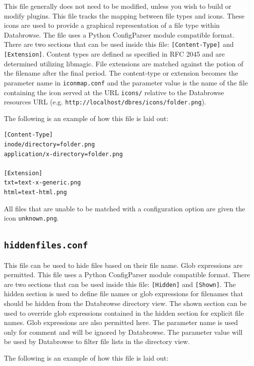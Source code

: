 \documentclass[10pt]{article}
\begin{document}
This file generally does not need to be modified, unless you wish to build or modify plugins.  This file tracks the mapping between file types and icons.  These icons are used to provide a graphical representation of a file type within Databrowse.  The file uses a Python ConfigParser module compatible format.  There are two sections that can be used inside this file:  \texttt{[Content-Type]} and \texttt{[Extension]}.  Content types are defined as specified in RFC 2045 and are determined utilizing libmagic.  File extensions are matched against the potion of the filename after the final period.  The content-type or extension becomes the parameter name in \texttt{iconmap.conf} and the parameter value is the name of the file containing the icon served at the URL \texttt{icons/} relative to the Databrowse resources URL (e.g. \texttt{http://localhost/dbres/icons/folder.png}).

The following is an example of how this file is laid out:

\begin{verbatim}
[Content-Type]
inode/directory=folder.png
application/x-directory=folder.png

[Extension]
txt=text-x-generic.png
html=text-html.png
\end{verbatim}

All files that are unable to be matched with a configuration option are given the icon \texttt{unknown.png}.

\subsection{\texttt{hiddenfiles.conf}}\label{hiddenfiles}

This file can be used to hide files based on their file name.  Glob expressions are permitted.  This file uses a Python ConfigParser module compatible format.  There are two sections that can be used inside this file:  \texttt{[Hidden]} and \texttt{[Shown]}.  The hidden section is used to define file names or glob expressions for filenames that should be hidden from the Databrowse directory view.  The shown section can be used to override glob expressions contained in the hidden section for explicit file names.  Glob expressions are also permitted here.  The parameter name is used only for comment and will be ignored by Databrowse.  The parameter value will be used by Databrowse to filter file lists in the directory view.

The following is an example of how this file is laid out:
\end{document}
